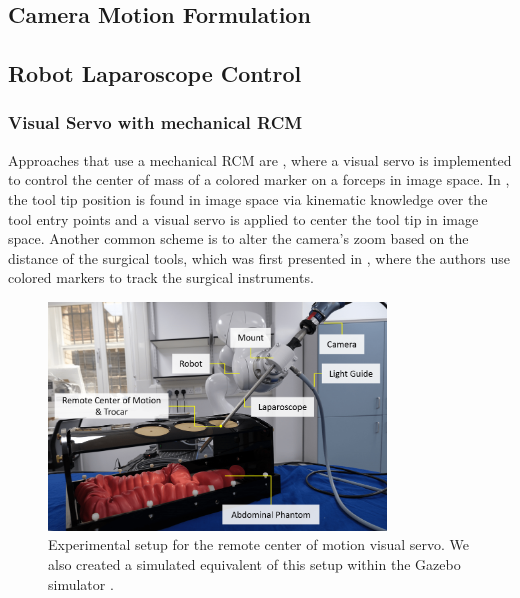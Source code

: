 \subsection{Camera Motion Formulation}
\subsection{Robot Laparoscope Control}
\subsubsection{Visual Servo with mechanical RCM}
Approaches that use a mechanical RCM are \cite{omote1999self}, where a visual servo is implemented to control the center of mass of a colored marker on a forceps in image space. In \cite{agustinos2014visual, voros2007automatic}, the tool tip position is found in image space via kinematic knowledge over the tool entry points and a visual servo is applied to center the tool tip in image space. Another common scheme is to alter the camera's zoom based on the distance of the surgical tools, which was first presented in \cite{king2013towards}, where the authors use colored markers to track the surgical instruments.

\begin{figure}
	\centering
	\includegraphics[width=0.8\textwidth]{chapter_2/img/labeled_setup_compressed.png}
	\caption{Experimental setup for the remote center of motion visual servo. We also created a simulated equivalent of this setup within the Gazebo simulator \cite{koenig2004design}.}
	\label{in:fig:experimental_setup}
\end{figure}

